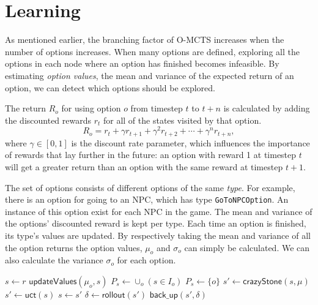 \section{Learning}
\label{sec:learning}
As mentioned earlier, the branching factor of O-MCTS increases when the number
of options increases.  When many options are defined, exploring all the options
in each node where an option has finished becomes infeasible. By estimating
\emph{option values}, the mean and variance of the expected return of an option,
we can detect which options should be explored.

The return $R_o$ for using option $o$ from timestep $t$ to $t+n$ is calculated
by adding the discounted rewards $r_t$ for all of the states visited by that
option.  $$R_o = r_{t} + \gamma r_{t+1} + \gamma^2 r_{t+2} + \cdots + \gamma^n
r_{t+n},$$ where $\gamma \in [0, 1]$ is the discount rate parameter, which
influences the importance of rewards that lay further in the future: an option
with reward 1 at timestep $t$ will get a greater return than an option with the
same reward at timestep $t+1$.  

The set of options consists of different options of the same \emph{type}. For example,
there is an option for going to an NPC, which has type \texttt{GoToNPCOption}.
An instance of this option exist for each NPC in the game.
The mean and variance of the options' discounted reward is kept per type. Each
time an option is finished, its type's values are updated.  By respectively taking the mean
and variance of all the option returns the option values, $\mu_o$ and $\sigma_o$ can simply be
calculated. We can also calculate the variance $\sigma_o$ for each option.

\begin{algorithm}
	\caption{$\mathsf{OL-MCTS}(r, max\_time, M)$}
	\label{alg:olmcts}
	\begin{algorithmic}[1]
		 \label{alg:olmcts:mainloop}
			\State $s \gets r$
			 \label{alg:olmcts:innerloop}
				 \label{alg:olmcts:sp}
				\State $\mathsf{updateValues}(\mu_o, s)$
					\State $P_s \gets \cup_o ( s \in I_o)$
				\Else
					\State $P_s \gets \{o\}$ %
				\EndIf \label{alg:olmcts:scs}
					\State $s' \gets \mathsf{crazyStone}(s, \mu)$ \label{alg:olmcts:crazystone}
				\Else
					\State $s' \gets \mathsf{uct}(s)$ \label{alg:olmcts:uct}
				\EndIf \label{alg:olmcts:ecs}
				\State $s \gets s'$ \label{alg:olmcts:ss}
			\EndWhile
			\State $\delta \gets \mathsf{rollout}(s')$ \label{alg:olmcts:rollout}
			\State $\mathsf{back\_up}(s', \delta)$ \label{alg:olmcts:backup}
		\EndWhile
	\end{algorithmic}
\end{algorithm}

